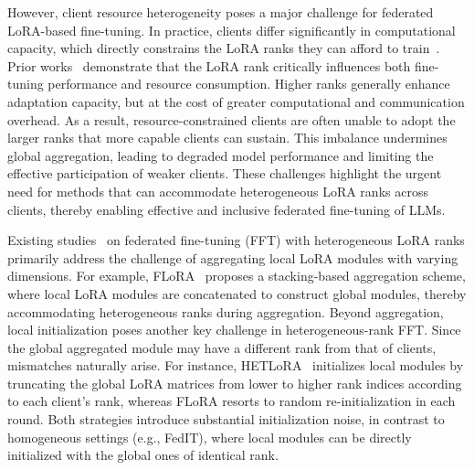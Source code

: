\documentclass{article} %
\begin{document}
However, client resource heterogeneity poses a major challenge for federated LoRA-based fine-tuning. In practice, clients differ significantly in computational capacity, which directly constrains the LoRA ranks they can afford to train~\cite{wangflora,bai2024federated}.
% 
Prior works~\cite{haoboincreasing,ren2024melora} demonstrate that the LoRA rank critically influences both fine-tuning performance and resource consumption. Higher ranks generally enhance adaptation capacity, but at the cost of greater computational and communication overhead. As a result, resource-constrained clients are often unable to adopt the larger ranks that more capable clients can sustain. This imbalance undermines global aggregation, leading to degraded model performance and limiting the effective participation of weaker clients. These challenges highlight the urgent need for methods that can accommodate heterogeneous LoRA ranks across clients, thereby enabling effective and inclusive federated fine-tuning of LLMs.

Existing studies~\cite{wangflora,cho2024heterogeneous,bai2024federated,zhang2024fed,zhang-fedhello} on federated fine-tuning (FFT) with heterogeneous LoRA ranks primarily address the challenge of aggregating local LoRA modules with varying dimensions. For example, FLoRA~\cite{wangflora} proposes a stacking-based aggregation scheme, where local LoRA modules are concatenated to construct global modules, thereby accommodating heterogeneous ranks during aggregation. Beyond aggregation, local initialization poses another key challenge in heterogeneous-rank FFT. Since the global aggregated module may have a different rank from that of clients, mismatches naturally arise. For instance, HETLoRA~\cite{cho2024heterogeneous} initializes local modules by truncating the global LoRA matrices from lower to higher rank indices according to each client’s rank, whereas FLoRA resorts to random re-initialization in each round. Both strategies introduce substantial initialization noise, in contrast to homogeneous settings (e.g., FedIT), where local modules can be directly initialized with the global ones of identical rank.
\end{document}

